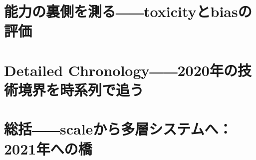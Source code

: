 \documentclass[lualatex,a4paper,11pt]{jlreq}
\begin{document}
\Needspace{0.45\textheight}
\bigskip
\section{能力の裏側を測る――toxicityとbiasの評価}
\label{pkg:evaluation-risk}
\vspace{0.15em}

\vspace{0.20em}
\begin{multicols}{2}

\end{multicols}

\medskip


\Needspace{0.45\textheight}
\bigskip
\section{Detailed Chronology――2020年の技術境界を時系列で追う}
\label{pkg:annual-chronology}
\vspace{0.15em}

\vspace{0.20em}
\begin{multicols}{2}

\end{multicols}
\medskip


\Needspace{0.45\textheight}
\bigskip
\section{総括――scaleから多層システムへ：2021年への橋}
\label{pkg:synthesis-transition-2021}
\vspace{0.15em}

\vspace{0.20em}
\begin{multicols}{2}

\end{multicols}
\medskip


\Needspace{0.30\textheight}
\bigskip
\Needspace{0.30\textheight}
\bigskip
{}\par
\smallskip
\printbibliography[title={References / Source Notes}]
\end{document}
